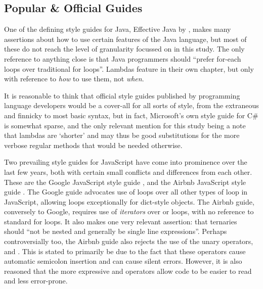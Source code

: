 \documentclass{article}
\begin{document}
    \subsection{Popular \& Official Guides}
        One of the defining style guides for Java, Effective Java by \cite{effectiveJava}, makes many assertions about how to use certain features of the Java language, but most of these do not reach the level of granularity focussed on in this study. The only reference to anything close is that Java programmers should ``prefer for-each loops over traditional for loops''. Lambdas feature in their own chapter, but only with reference to \emph{how} to use them, not \emph{when}.

        It is reasonable to think that official style guides published by programming language developers would be a cover-all for all sorts of style, from the extraneous and finnicky to most basic syntax, but in fact, Microsoft's own style guide for C\# \citep{microsoftCSStyle} is somewhat sparse, and the only relevant mention for this study being a note that lambdas are `shorter' and may thus be good substitutions for the more verbose regular methods that would be needed otherwise.

        Two prevailing style guides for JavaScript have come into prominence over the last few years, both with certain small conflicts and differences from each other. These are the Google JavaScript style guide \citep{googleJSStyle}, and the Airbnb JavaScript style guide \citep{airbnbJSStyle}. The Google guide advocates use of  loops over all other types of  loop in JavaScript, allowing  loops exceptionally for dict-style objects. The Airbnb guide, conversely to Google, requires use of \emph{iterators} over  or  loops, with no reference to standard for loops. It also makes one very relevant assertion: that ternaries should ``not be nested and generally be single line expressions''. Perhaps controversially too, the Airbnb guide also rejects the use of the unary operators, \codeword{++} and \codeword{--}. This is stated to primarily be due to the fact that these operators cause automatic semicolon insertion and can cause silent errors. However, it is also reasoned that the more expressive \codeword{+=} and \codeword{-=} operators allow code to be easier to read and less error-prone.
\end{document}

